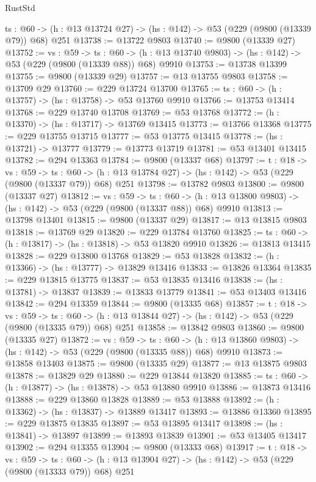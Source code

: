 \begin{lexlean}{RustStd}
\begin{coremodule}
  {ts : @60} -> (h : @13 @13724 @27) -> (hs : @142) -> @53 (@229 (@9800 (@13339 @79)) @68) @251
@13738 := @13722 @9803
@13740 := @9800 (@13339 @27)
@13752 := {vs : @59} ->
  {ts : @60} -> (h : @13 @13740 @9803) -> (hs : @142) -> @53 (@229 (@9800 (@13339 @88)) @68) @9910
@13753 := @13738 @13399
@13755 := @9800 (@13339 @29)
@13757 := @13 @13755 @9803
@13758 := @13709 @29
@13760 := @229 @13724 @13700
@13765 := {ts : @60} -> (h : @13757) -> (hs : @13758) -> @53 @13760 @9910
@13766 := @13753 @13414
@13768 := @229 @13740 @13708
@13769 := @53 @13768
@13772 := (h : @13370) -> (hs : @13717) -> @13769 @13415
@13773 := @13766 @13368
@13775 := @229 @13755 @13715
@13777 := @53 @13775 @13415
@13778 := (hs : @13721) -> @13777
@13779 := @13773 @13719
@13781 := @53 @13401 @13415
@13782 := @294 @13363
@13784 := @9800 (@13337 @68)
@13797 := {t : @18} ->
  {vs : @59} ->
  {ts : @60} -> (h : @13 @13784 @27) -> (hs : @142) -> @53 (@229 (@9800 (@13337 @79)) @68) @251
@13798 := @13782 @9803
@13800 := @9800 (@13337 @27)
@13812 := {vs : @59} ->
  {ts : @60} -> (h : @13 @13800 @9803) -> (hs : @142) -> @53 (@229 (@9800 (@13337 @88)) @68) @9910
@13813 := @13798 @13401
@13815 := @9800 (@13337 @29)
@13817 := @13 @13815 @9803
@13818 := @13769 @29
@13820 := @229 @13784 @13760
@13825 := {ts : @60} -> (h : @13817) -> (hs : @13818) -> @53 @13820 @9910
@13826 := @13813 @13415
@13828 := @229 @13800 @13768
@13829 := @53 @13828
@13832 := (h : @13366) -> (hs : @13777) -> @13829 @13416
@13833 := @13826 @13364
@13835 := @229 @13815 @13775
@13837 := @53 @13835 @13416
@13838 := (hs : @13781) -> @13837
@13839 := @13833 @13779
@13841 := @53 @13403 @13416
@13842 := @294 @13359
@13844 := @9800 (@13335 @68)
@13857 := {t : @18} ->
  {vs : @59} ->
  {ts : @60} -> (h : @13 @13844 @27) -> (hs : @142) -> @53 (@229 (@9800 (@13335 @79)) @68) @251
@13858 := @13842 @9803
@13860 := @9800 (@13335 @27)
@13872 := {vs : @59} ->
  {ts : @60} -> (h : @13 @13860 @9803) -> (hs : @142) -> @53 (@229 (@9800 (@13335 @88)) @68) @9910
@13873 := @13858 @13403
@13875 := @9800 (@13335 @29)
@13877 := @13 @13875 @9803
@13878 := @13829 @29
@13880 := @229 @13844 @13820
@13885 := {ts : @60} -> (h : @13877) -> (hs : @13878) -> @53 @13880 @9910
@13886 := @13873 @13416
@13888 := @229 @13860 @13828
@13889 := @53 @13888
@13892 := (h : @13362) -> (hs : @13837) -> @13889 @13417
@13893 := @13886 @13360
@13895 := @229 @13875 @13835
@13897 := @53 @13895 @13417
@13898 := (hs : @13841) -> @13897
@13899 := @13893 @13839
@13901 := @53 @13405 @13417
@13902 := @294 @13355
@13904 := @9800 (@13333 @68)
@13917 := {t : @18} ->
  {vs : @59} ->
  {ts : @60} -> (h : @13 @13904 @27) -> (hs : @142) -> @53 (@229 (@9800 (@13333 @79)) @68) @251

\end{coremodule}
\end{lexlean}
